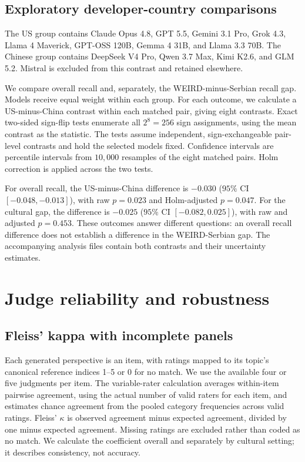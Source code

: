 \documentclass[11pt,a4paper]{article}
\begin{document}
\subsection{Exploratory developer-country comparisons}
\label{app:country-tests}
The US group contains Claude Opus 4.8, GPT 5.5, Gemini 3.1 Pro, Grok 4.3, Llama 4 Maverick, GPT-OSS 120B, Gemma 4 31B, and Llama 3.3 70B. The Chinese group contains DeepSeek V4 Pro, Qwen 3.7 Max, Kimi K2.6, and GLM 5.2. Mistral is excluded from this contrast and retained elsewhere.

We compare overall recall and, separately, the WEIRD-minus-Serbian recall gap. Models receive equal weight within each group. For each outcome, we calculate a US-minus-China contrast within each matched pair, giving eight contrasts. Exact two-sided sign-flip tests enumerate all $2^8=256$ sign assignments, using the mean contrast as the statistic. The tests assume independent, sign-exchangeable pair-level contrasts and hold the selected models fixed. Confidence intervals are percentile intervals from $10{,}000$ resamples of the eight matched pairs. Holm correction is applied across the two tests.

For overall recall, the US-minus-China difference is $-0.030$ ($95\%$ CI $[-0.048,-0.013]$), with raw $p=0.023$ and Holm-adjusted $p=0.047$. For the cultural gap, the difference is $-0.025$ ($95\%$ CI $[-0.082,0.025]$), with raw and adjusted $p=0.453$. These outcomes answer different questions: an overall recall difference does not establish a difference in the WEIRD-Serbian gap. The accompanying analysis files contain both contrasts and their uncertainty estimates.



\section{Judge reliability and robustness}
\label{app:reliability}

\subsection{Fleiss' kappa with incomplete panels}
\label{app:agreement_coefficients}
Each generated perspective is an item, with ratings mapped to its topic's canonical reference indices 1--5 or 0 for no match. We use the available four or five judgments per item. The variable-rater calculation averages within-item pairwise agreement, using the actual number of valid raters for each item, and estimates chance agreement from the pooled category frequencies across valid ratings. Fleiss' $\kappa$ is observed agreement minus expected agreement, divided by one minus expected agreement. Missing ratings are excluded rather than coded as no match. We calculate the coefficient overall and separately by cultural setting; it describes consistency, not accuracy.
\end{document}

